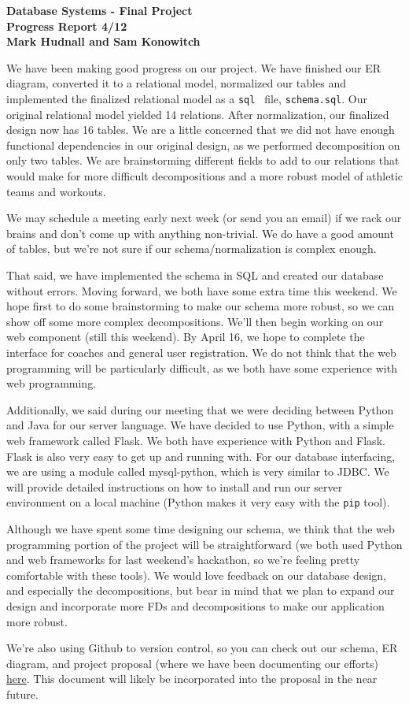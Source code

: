 \documentclass{article}
\begin{document}
\begin{center}
\textbf{Database Systems - Final Project \\
        Progress Report 4/12 \\
        Mark Hudnall and Sam Konowitch
        }
\end{center}

We have been making good progress on our project. We have finished our ER diagram, 
converted it to a relational model, normalized our tables and implemented the 
finalized relational model as a {\tt sql } file, {\tt schema.sql}. Our original
relational model yielded 14 relations. After normalization, our finalized design
now has 16 tables. We are a little concerned that we did not have enough functional
dependencies in our original design, as we performed decomposition on only two tables.
We are brainstorming different fields to add to our relations that would make for
more difficult decompositions and a more robust model of athletic teams and workouts. 

We may schedule a meeting early next week (or send you an email) if we rack our brains
and don't come up with anything non-trivial. We do have a good amount of tables, but 
we're not sure if our schema/normalization is complex enough.

That said, we have implemented the schema in SQL and created our database without errors.
Moving forward, we both have some extra time this weekend. We hope first to do  
some brainstorming to make our schema more robust, so we can show off some more 
complex decompositions. We'll then begin working on our web component (still this weekend).
By April 16, we hope to complete the interface for coaches and general user registration. 
We do not think that the web programming will be particularly difficult, as we both
have some experience with web programming.

Additionally, we said during our meeting that we were deciding between Python and Java for
our server language. We have decided to use Python, with a simple web framework called
Flask. We both have experience with Python and Flask. Flask is also very easy to get up 
and running with.  For our database interfacing, we are using a module called mysql-python, 
which is very similar to JDBC. We will provide detailed instructions on how to install and run
our server environment on a local machine (Python makes it very easy with the {\tt pip} tool). 

Although we have spent some time designing our schema, we think that the web programming
portion of the project will be straightforward (we both used Python and web frameworks
for last weekend's hackathon, so we're feeling pretty comfortable with these tools). 
We would love feedback on our database design, and especially the decompositions, but 
bear in mind that we plan to expand our design and incorporate more FDs and decompositions
to make our application more robust. 

We're also using Github to version control, so you can check out our schema, ER diagram, 
and project proposal (where we have been documenting our efforts) 
\href{https://github.com/landakram/database-final}{here}. This document will likely be 
incorporated into the proposal in the near future.
\end{document}
